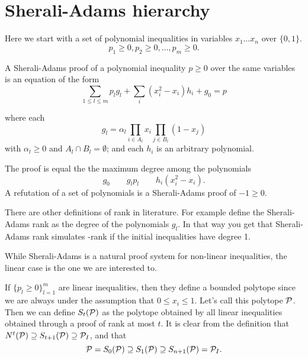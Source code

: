 \documentclass[a4paper,twoside,justified]{tufte-handout}
\begin{document}
\section{Sherali-Adams hierarchy}

Here we start with a set of polynomial inequalities in variables $
x_{1}\ldots x_{n} $ over $ \{0,1\} $.
\begin{equation}
  p_{1}\geq 0 , p_{2}\geq 0, \ldots , p_{m} \geq 0. 
\end{equation}

A Sherali-Adams proof of a polynomial inequality $p\geq 0$ over the
same variables is an equation of the form
\begin{equation}
 \label{eq:sa_inference}
 \sum_{1\leq l\leq m} p_{l} g_{l} + \sum_{i} (x^{2}_{i} -x_{i}) h_{i}
 + g_{0}= p
\end{equation}

where each 
\begin{equation}
  g_{l} = \alpha_{l} \prod_{i\in A_{l}} x_{i} \prod_{j \in
    B_{l}}(1-x_{j})  
\end{equation}
with $ \alpha_{l}\geq 0 $ and $ A_{l} \cap B_{l}=\emptyset $; and each
$ h_{i} $ is an arbitrary polynomial.

The 
proof is equal the the maximum degree among the polynomials 
\begin{equation}
g_{0} \qquad g_{l}p_{l} \qquad h_{i}(x^{2}_{i}- x_{i}).  
\end{equation}
%
A refutation of a set of polynomials is a Sherali-Adams proof of $ -1
\geq 0 $.

There are other definitions of rank in literature. For
example\cite{laurent01} define the Sherali-Adams rank as the degree of
the polynomials $ g_{l} $. In that way you get that Sherali-Adams rank
simulates \Lovasz-\Schrijver rank if the initial inequalities have
degree 1.


While Sherali-Adams is a natural proof system for non-linear
inequalities, the linear case is the one we are interested to.

If $ \{p_{l}\geq 0\}^{m}_{l=1} $ are linear inequalities, then they
define a bounded polytope since we are always under the assumption
that $0\leq x_{i}\leq 1 $. Let's call this polytope $ \mathcal{P} $. Then
we can define $ S_{t}(\mathcal{P}) $ as the polytope obtained by all
linear inequalities obtained through a proof of rank at most $ t $. It
is clear from the definition that $ N^{t}(\mathcal{P}) \supseteq
S_{t+1}(\mathcal{P}) \supseteq \mathcal{P}_{I} $, and that
\begin{equation}
  \mathcal{P}=S_{0}(\mathcal{P}) \supseteq S_{1}(\mathcal{P}) \supseteq
  S_{n+1}(\mathcal{P}) = \mathcal{P}_{I}.
\end{equation}
\end{document}
